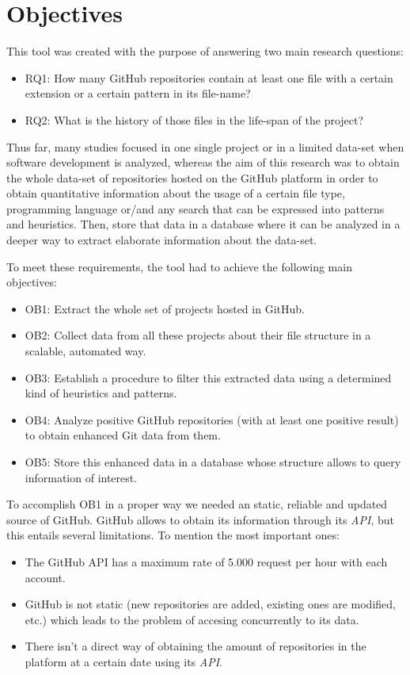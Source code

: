 \documentclass[a4paper, 12pt]{book}
\begin{document}
\chapter{Objectives}
\label{sec:objectives}
This tool was created with the purpose of answering two main research questions:
\begin{itemize}
  \item RQ1: How many GitHub repositories contain at least one file with a certain extension or a certain
        pattern in its file-name?
  \item RQ2: What is the history of those files in the life-span of the project?
\end{itemize}
Thus far, many studies focused in one single project or in a limited data-set when software development is analyzed,
whereas the aim of this research was to obtain the whole data-set of repositories hosted on the GitHub platform
in order to obtain quantitative information about the usage of a certain file type, programming language
or/and any search that can be expressed into patterns and heuristics. Then, store that data in a database
where it can be analyzed in a deeper way to extract elaborate information about the data-set.\par
To meet these requirements, the tool had to achieve the following main objectives:
\begin{itemize}
  \item OB1: Extract the whole set of projects hosted in GitHub.
  \item OB2: Collect data from all these projects about their file structure in a scalable, automated way.
  \item OB3: Establish a procedure to filter this extracted data using a determined kind of heuristics and patterns.
  \item OB4: Analyze positive GitHub repositories (with at least one positive result) to obtain enhanced Git data from them.
  \item OB5: Store this enhanced data in a database whose structure allows to query information of interest.
\end{itemize}
To accomplish OB1 in a proper way we needed an static, reliable and updated source of GitHub.
GitHub allows to obtain its information through its \textit{API},
but this entails several limitations. To mention the most important ones:
\begin{itemize}
    \item The GitHub API has a maximum rate of 5.000 request per hour with each account.
    \item GitHub is not static (new repositories are added, existing ones are modified, etc.) which leads to the problem of
    accesing concurrently to its data.
    \item There isn't a direct way
    of obtaining the amount of repositories in the platform at a certain date using its \textit{API}.
\end{itemize}
\end{document}
